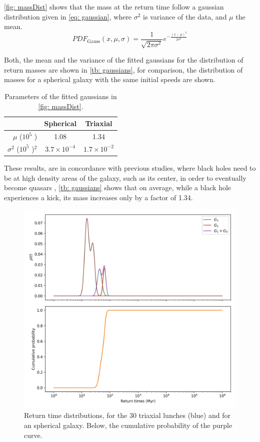 	\autoref{fig: massDist} shows that the mass at the return time follow a gaussian distribution given in \autoref{eq: gaussian}, where $\sigma^2$ is variance of the data, and $\mu$ the mean.
	\begin{equation}\label{eq: gaussian}
		PDF_\text{Gauss}(x, \mu, \sigma) = \dfrac{1}{\sqrt{2\pi\sigma^2}}e^{-\frac{(x - \mu)^2}{2\sigma^2}}
	\end{equation}
	
	Both, the mean and the variance of the fitted gaussians for the distribution of return masses are shown in \autoref{tb: gaussians}, for comparison, the distribution of masses for a spherical galaxy with the same initial speeds are shown.
	\begin{table}[h]
		\centering
		\caption{Parameters of the fitted gaussians in \autoref{fig: massDist}.}
		\begin{tabular}{r|cc}
			\hline
			& \textbf{Spherical} & \textbf{Triaxial} \\
			\hline
			$\mu$ ($10^5$ \sm)& 1.08 & 1.34 \\
			$\sigma^2$ ($10^5$ \sm)$^2$& $3.7\times10^{-4}$ & $1.7\times10^{-2}$\\
			\hline
		\end{tabular}
		\label{tb: gaussians}
	\end{table}

	These results, are in concordance with previous studies, where black holes need to be at high density areas of the galaxy, such as its center, in order to eventually become quasars \cite{tanaka2009assembly}, \autoref{tb: gaussians} shows that on average, while a black hole experiences a kick, its mass increases only by a factor of 1.34.

	\begin{figure}[h]
		\centering
		\includegraphics[width = 0.8\linewidth]{"../Files/Week 14/dist_times"}
		\caption{Return time distributions, for the 30 triaxial lunches (blue) and for an spherical galaxy. Below, the cumulative probability of the purple curve.}
		\label{fig: timeDist}
	\end{figure}


